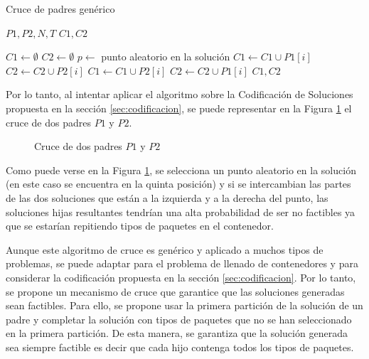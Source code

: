 \begin{algorithm}[H]
    \caption{Cruce de padres genérico}\label{alg:crucePadresGenerico}
    \begin{algorithmic}[1]
        \Require $P1, P2, N, T$
        \Ensure $C1, C2$

        \State $C1 \leftarrow \emptyset$
        \State $C2 \leftarrow \emptyset$
        \State $p \leftarrow$ punto aleatorio en la solución
        \State $C1 \leftarrow C1 \cup P1[i]$
        \State $C2 \leftarrow C2 \cup P2[i]$
        \Else
        \State $C1 \leftarrow C1 \cup P2[i]$
        \State $C2 \leftarrow C2 \cup P1[i]$
        \EndIf
        \EndFor
        \State \Return $C1, C2$
    \end{algorithmic}
\end{algorithm}

Por lo tanto, al intentar aplicar el algoritmo sobre la Codificación de Soluciones propuesta en la sección \ref{sec:codificacion}, se puede representar en la Figura \ref{fig:cruce_simple} el cruce de dos padres $P1$ y $P2$.

\begin{figure}[H]
    \centering
    
    \caption{Cruce de dos padres $P1$ y $P2$}
    \label{fig:cruce_simple}
\end{figure}

Como puede verse en la Figura \ref{fig:cruce_simple}, se selecciona un punto aleatorio en la solución (en este caso se encuentra en la quinta posición) y si se intercambian las partes de las dos soluciones que están a la izquierda y a la derecha del punto, las soluciones hijas resultantes tendrían una alta probabilidad de ser no factibles ya que se estarían repitiendo tipos de paquetes en el contenedor.

Aunque este algoritmo de cruce es genérico y aplicado a muchos tipos de problemas, se puede adaptar para el problema de llenado de contenedores y para considerar la codificación propuesta en la sección \ref{sec:codificacion}. Por lo tanto, se propone un mecanismo de cruce que garantice que las soluciones generadas sean factibles. Para ello, se propone usar la primera partición de la solución de un padre y completar la solución con tipos de paquetes que no se han seleccionado en la primera partición. De esta manera, se garantiza que la solución generada sea siempre factible es decir que cada hijo contenga todos los tipos de paquetes.

